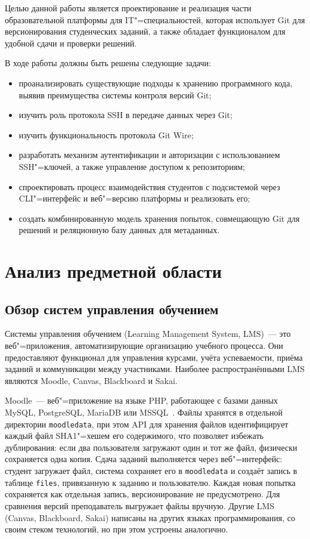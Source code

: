 \documentclass[coursework]{SCWorks}
\begin{document}
Целью данной работы является проектирование и реализация части образовательной платформы для IT"=специальностей, которая использует Git для версионирования студенческих заданий, а также обладает функционалом для удобной сдачи и проверки решений.

В ходе работы должны быть решены следующие задачи:
\begin{itemize}
	\item проанализировать существующие подходы к хранению программного кода, выявив преимущества системы контроля версий Git;
	\item изучить роль протокола SSH в передаче данных через Git;
	\item изучить функциональность протокола Git Wire;
	\item разработать механизм аутентификации и авторизации с использованием SSH"=ключей, а также управление доступом к репозиториям;
	\item спроектировать процесс взаимодействия студентов с подсистемой через CLI"=интерфейс и веб"=версию платформы и реализовать его;
	\item создать комбинированную модель хранения попыток, совмещающую Git для решений и реляционную базу данных для метаданных.
\end{itemize}

\section{Анализ предметной области}

\subsection{Обзор систем управления обучением}
\label{sec:start}

Системы управления обучением (Learning Management System, LMS)~--- это веб"=приложения, автоматизирующие организацию учебного процесса. Они предоставляют функционал для управления курсами, учёта успеваемости, приёма заданий и коммуникации между участниками. Наиболее распространёнными LMS являются Moodle, Canvas, Blackboard и Sakai.

Moodle~--- веб"=приложение на языке PHP, работающее с базами данных MySQL, PostgreSQL, MariaDB или MSSQL~\cite{moodlearch}. Файлы хранятся в отдельной директории \texttt{moodledata}, при этом API для хранения файлов идентифицирует каждый файл SHA1"=хешем его содержимого, что позволяет избежать дублирования: если два пользователя загружают один и тот же файл, физически сохраняется одна копия. Сдача заданий выполняется через веб"=интерфейс: студент загружает файл, система сохраняет его в \texttt{moodledata} и создаёт запись в таблице \texttt{files}, привязанную к заданию и пользователю. Каждая новая попытка сохраняется как отдельная запись, версионирование не предусмотрено. Для сравнения версий преподаватель выгружает файлы вручную. Другие LMS (Canvas, Blackboard, Sakai) написаны на других языках программирования, со своим стеком технологий, но при этом устроены аналогично.
\end{document}
